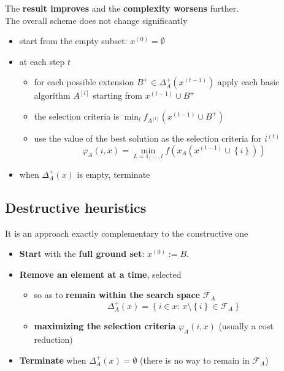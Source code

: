 The \textbf{result improves} and the \textbf{complexity worsens} further.\\

The overall scheme does not change significantly
\begin{itemize}
	\item start from the empty subset: $x^{(0)} = \emptyset$
	
	\item at each step $t$
	\begin{itemize}
		\item for each possible extension $B^+ \in \Delta_A^+ (x^{(t−1)})$ apply each basic algorithm $A^{[l]}$ starting from $x^{(t−1)} \cup B^+$
		
		\item the selection criteria is $\min_l f_{A^{[l]}} (x^{(t−1)} \cup B^+)$
		
		\item use the value of the best solution as the selection criteria for $i^{(t)}$
		$$ \varphi_A (i,x) = \min_{L = 1, \, ... \, , l} f \left(x_A \left(x^{(t-1)} \cup \left\{i\right\} \right) \right) $$
	\end{itemize}
	\item when $\Delta_A^+ (x)$ is empty, terminate
\end{itemize}

\newpage

\subsection{Destructive heuristics}
It is an approach exactly complementary to the constructive one
\begin{itemize}
	\item \textbf{Start} with the \textbf{full ground set}: $x^{(0)} := B$.\\
	
	\item \textbf{Remove an element at a time}, selected 
	\begin{itemize}
		\item so as to \textbf{remain within the search space} $\mathcal{F}_A$
		$$ \Delta_A^+ (x) = \left\{i \in x : \, x \setminus \left\{i\right\} \in \mathcal{F}_A \right\} $$
		
		\item \textbf{maximizing the selection criteria} $\varphi_A (i, x)$ (usually a cost reduction)
	\end{itemize}
	\nn
	
	\item \textbf{Terminate} when $\Delta_A^+ (x) = \emptyset$ (there is no way to remain in $\mathcal{F}_A$)
\end{itemize}


